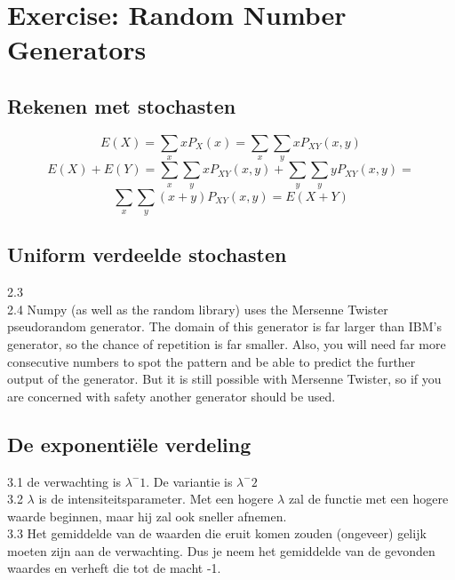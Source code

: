 \documentclass[pdftex,12pt,a4paper]{article}
\begin{document}

\section{Exercise: Random Number Generators}
    \subsection{Rekenen met stochasten}
        $$E(X)=\sum\limits_{x}xP_X(x) = \sum\limits_{x}\sum\limits_{y}xP_{XY}(x,y)$$
        $$E(X) + E(Y) = \sum\limits_{x}\sum\limits_{y}xP_{XY}(x,y) + \sum\limits_{y}\sum\limits_{y}yP_{XY}(x,y) = $$
        $$\sum\limits_{x}\sum\limits_{y}(x + y)P_{XY}(x,y) = E(X+Y)$$

    \subsection{Uniform verdeelde stochasten}
        2.3 \\
        2.4 Numpy (as well as the random library) uses the Mersenne Twister pseudorandom generator. The domain of this generator is far larger than IBM's generator, so the chance of repetition is far smaller. Also, you will need far more  consecutive numbers to spot the pattern and be able to predict the further output of the generator. But it is still possible with Mersenne Twister, so if you are concerned with safety another generator should be used.\\

    \subsection{De exponentiële verdeling}
        3.1 de verwachting is $\lambda^-1$. De variantie is $\lambda^-2$\\
        3.2 $\lambda$ is de intensiteitsparameter. Met een hogere $\lambda$ zal de functie 
        met een hogere waarde beginnen, maar hij zal ook sneller afnemen. \\
        3.3 Het gemiddelde van de waarden die eruit komen zouden (ongeveer) gelijk moeten zijn aan de verwachting.
        Dus je neem het gemiddelde van de gevonden waardes en verheft die tot de macht -1.\\

\pagebreak
\end{document}
